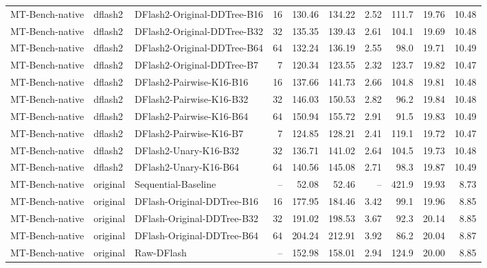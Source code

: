 \begin{longtable}{lllrrrrrrr}
MT-Bench-native & dflash2 & DFlash2-Original-DDTree-B16 & 16 & 130.46 & 134.22 & 2.52 & 111.7 & 19.76 & 10.48 \\
MT-Bench-native & dflash2 & DFlash2-Original-DDTree-B32 & 32 & 135.35 & 139.43 & 2.61 & 104.1 & 19.69 & 10.48 \\
MT-Bench-native & dflash2 & DFlash2-Original-DDTree-B64 & 64 & 132.24 & 136.19 & 2.55 & 98.0 & 19.71 & 10.49 \\
MT-Bench-native & dflash2 & DFlash2-Original-DDTree-B7 & 7 & 120.34 & 123.55 & 2.32 & 123.7 & 19.82 & 10.47 \\
MT-Bench-native & dflash2 & DFlash2-Pairwise-K16-B16 & 16 & 137.66 & 141.73 & 2.66 & 104.8 & 19.81 & 10.48 \\
MT-Bench-native & dflash2 & DFlash2-Pairwise-K16-B32 & 32 & 146.03 & 150.53 & 2.82 & 96.2 & 19.84 & 10.48 \\
MT-Bench-native & dflash2 & DFlash2-Pairwise-K16-B64 & 64 & 150.94 & 155.72 & 2.91 & 91.5 & 19.83 & 10.49 \\
MT-Bench-native & dflash2 & DFlash2-Pairwise-K16-B7 & 7 & 124.85 & 128.21 & 2.41 & 119.1 & 19.72 & 10.47 \\
MT-Bench-native & dflash2 & DFlash2-Unary-K16-B32 & 32 & 136.71 & 141.02 & 2.64 & 104.5 & 19.73 & 10.48 \\
MT-Bench-native & dflash2 & DFlash2-Unary-K16-B64 & 64 & 140.56 & 145.08 & 2.71 & 98.3 & 19.87 & 10.49 \\
MT-Bench-native & original & Sequential-Baseline & -- & 52.08 & 52.46 & -- & 421.9 & 19.93 & 8.73 \\
MT-Bench-native & original & DFlash-Original-DDTree-B16 & 16 & 177.95 & 184.46 & 3.42 & 99.1 & 19.96 & 8.85 \\
MT-Bench-native & original & DFlash-Original-DDTree-B32 & 32 & 191.02 & 198.53 & 3.67 & 92.3 & 20.14 & 8.85 \\
MT-Bench-native & original & DFlash-Original-DDTree-B64 & 64 & 204.24 & 212.91 & 3.92 & 86.2 & 20.04 & 8.87 \\
MT-Bench-native & original & Raw-DFlash & -- & 152.98 & 158.01 & 2.94 & 124.9 & 20.00 & 8.85 \\
\end{longtable}


